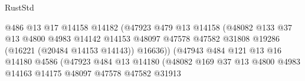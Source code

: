 \begin{lexlean}{RustStd}
\begin{coremodule}
                                              @486
                                              @13
                                              @17
                                              @14158
                                              @14182
                                              (@47923
                                                @479
                                                @13
                                                @14158
                                                (@48082
                                                  @133
                                                  @37
                                                  @13
                                                  @4800
                                                  @4983
                                                  @14142
                                                  @14153
                                                  @48097
                                                  @47578
                                                  @47582
                                                  @31808
                                                  @19286
                                                  (@16221 (@20484 @14153 @14143))
                                                  @16636))
                                              (@47943
                                                @484
                                                @121
                                                @13
                                                @16
                                                @14180
                                                @4586
                                                (@47923
                                                  @484
                                                  @13
                                                  @14180
                                                  (@48082
                                                    @169
                                                    @37
                                                    @13
                                                    @4800
                                                    @4983
                                                    @14163
                                                    @14175
                                                    @48097
                                                    @47578
                                                    @47582
                                                    @31913

\end{coremodule}
\end{lexlean}
